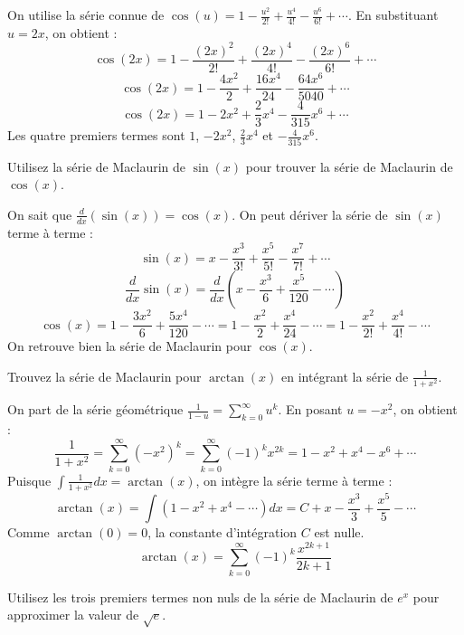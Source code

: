 \begin{correctionbox}
On utilise la série connue de $\cos(u) = 1 - \frac{u^2}{2!} + \frac{u^4}{4!} - \frac{u^6}{6!} + \cdots$.
En substituant $u = 2x$, on obtient :
$$ \cos(2x) = 1 - \frac{(2x)^2}{2!} + \frac{(2x)^4}{4!} - \frac{(2x)^6}{6!} + \cdots $$
$$ \cos(2x) = 1 - \frac{4x^2}{2} + \frac{16x^4}{24} - \frac{64x^6}{5040} + \cdots $$
$$ \cos(2x) = 1 - 2x^2 + \frac{2}{3}x^4 - \frac{4}{315}x^6 + \cdots $$
Les quatre premiers termes sont $1$, $-2x^2$, $\frac{2}{3}x^4$ et $-\frac{4}{315}x^6$.
\end{correctionbox}

\begin{exercicebox}
Utilisez la série de Maclaurin de $\sin(x)$ pour trouver la série de Maclaurin de $\cos(x)$.
\end{exercicebox}

\begin{correctionbox}
On sait que $\frac{d}{dx}(\sin(x)) = \cos(x)$. On peut dériver la série de $\sin(x)$ terme à terme :
$$ \sin(x) = x - \frac{x^3}{3!} + \frac{x^5}{5!} - \frac{x^7}{7!} + \cdots $$
$$ \frac{d}{dx} \sin(x) = \frac{d}{dx} \left( x - \frac{x^3}{6} + \frac{x^5}{120} - \cdots \right) $$
$$ \cos(x) = 1 - \frac{3x^2}{6} + \frac{5x^4}{120} - \cdots = 1 - \frac{x^2}{2} + \frac{x^4}{24} - \cdots = 1 - \frac{x^2}{2!} + \frac{x^4}{4!} - \cdots $$
On retrouve bien la série de Maclaurin pour $\cos(x)$.
\end{correctionbox}

\begin{exercicebox}
Trouvez la série de Maclaurin pour $\arctan(x)$ en intégrant la série de $\frac{1}{1+x^2}$.
\end{exercicebox}

\begin{correctionbox}
On part de la série géométrique $\frac{1}{1-u} = \sum_{k=0}^{\infty} u^k$. En posant $u = -x^2$, on obtient :
$$ \frac{1}{1+x^2} = \sum_{k=0}^{\infty} (-x^2)^k = \sum_{k=0}^{\infty} (-1)^k x^{2k} = 1 - x^2 + x^4 - x^6 + \cdots $$
Puisque $\int \frac{1}{1+x^2} dx = \arctan(x)$, on intègre la série terme à terme :
$$ \arctan(x) = \int (1 - x^2 + x^4 - \cdots) dx = C + x - \frac{x^3}{3} + \frac{x^5}{5} - \cdots $$
Comme $\arctan(0) = 0$, la constante d'intégration $C$ est nulle.
$$ \arctan(x) = \sum_{k=0}^{\infty} (-1)^k \frac{x^{2k+1}}{2k+1} $$
\end{correctionbox}

\begin{exercicebox}
Utilisez les trois premiers termes non nuls de la série de Maclaurin de $e^x$ pour approximer la valeur de $\sqrt{e}$.
\end{exercicebox}

